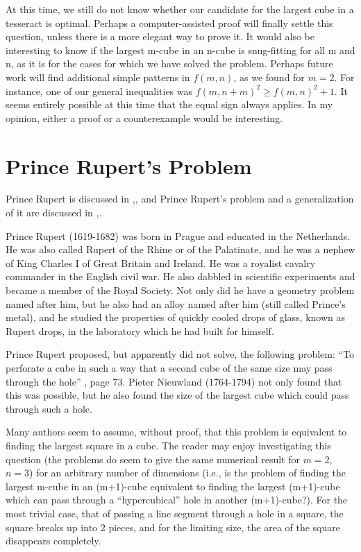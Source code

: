 At this time, we still do not know whether our candidate for the
largest cube in a tesseract is optimal. Perhaps a computer-assisted proof
will finally settle this question, unless there is a more elegant way to
prove it. It would also be interesting to know if the largest m-cube in an
n-cube is snug-fitting for all m and n, as it is for the cases for which we
have solved the problem. Perhaps future work will find additional simple
patterns in $f(m,n)$, as we found for $m = 2$. For instance, one of our general
inequalities was $f(m,n+m)^2 \geq f(m,n)^2 + 1$. It seems entirely possible at
this time that the equal sign always applies. In my opinion, either a proof
or a counterexample would be interesting.

\section*{Prince Rupert's Problem}

Prince Rupert is discussed in \cite{britannica1964},\cite{schreck1950a},
and Prince Rupert's problem and a generalization of it are discussed in
\cite{schreck1950a},\cite{schreck1950b}.

Prince Rupert (1619-1682) was born in Prague and educated in the
Netherlands. He was also called Rupert of the Rhine or of the Palatinate,
and he was a nephew of King Charles I of Great Britain and Ireland. He was
a royalist cavalry commander in the English civil war. He also dabbled in
scientific experiments and became a member of the Royal Society. Not
only did he have a geometry problem named after him, but he also had an
alloy named after him (still called Prince's metal), and he studied the
properties of quickly cooled drops of glass, known as Rupert drops, in the
laboratory which he had built for himself.

Prince Rupert proposed, but apparently did not solve, the following
problem: ``To perforate a cube in such a way that a second cube of the
same size may pass through the hole'' \cite{schreck1950a}, page 73. Pieter
Nieuwland (1764-1794) not only found that this was possible, but he also
found the size of the largest cube which could pass through such a hole.

Many authors seem to assume, without proof, that this problem is
equivalent to finding the largest square in a cube. The reader may enjoy
investigating this question (the problems do seem to give the same
numerical result for $m = 2$, $n = 3$) for an arbitrary number of dimensions
(i.e., is the problem of finding the largest m-cube in an (m+1)-cube
equivalent to finding the largest (m+1)-cube which can pass through a
``hypercubical'' hole in another (m+1)-cube?). For the most trivial case,
that of passing a line segment through a hole in a square, the square
breaks up into 2 pieces, and for the limiting size, the area of the square
disappears completely.
